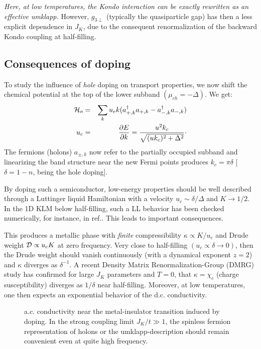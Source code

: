  \emph{Here, 
at low temperatures, the Kondo interaction
can be exactly rewritten as an effective umklapp.}
However, $g_{3\perp}$ (typically
 the quasiparticle gap) has then a less explicit
dependence in $J_K$, due to the consequent renormalization of the 
backward Kondo coupling at half-filling. 

\subsection{Consequences of doping}

To study the influence of {\it hole} doping on transport properties, 
we now shift the chemical potential
at the top of the lower subband $(\mu_{ch}=-\Delta)$. We get:
\begin{eqnarray}
\label{zero}
{\cal H}_o&=&\sum_k u_c k(a^{\dag}_{+,k}a_{+,k}-a^{\dag}_{-,k}a_{-,k})\\ 
\nonumber
u_c&=&\frac{\partial E}{\partial k}=\frac{u^2
  k_c}{\sqrt{(uk_c)^2+\Delta^2}}\cdot 
\end{eqnarray} 
The fermions (holons) $a_{\pm,k}$ now refer to the partially occupied subband
and linearizing the band structure near the new Fermi points produces
$k_c=\pi\delta$ [$\delta=1-n$, being the hole doping]. 

By
doping such a semiconductor, 
low-energy properties should be well described through a Luttinger liquid
Hamiltonian with a velocity $u_c\sim \delta/\Delta$ and $K\rightarrow 1/2$.
In the 1D KLM below half-filling, such a LL behavior
has been checked numerically, for instance, in ref.\cite{Tsvelik_LL}.
This leads to important consequences. 

This produces a metallic phase with {\it finite} compressibility
$\kappa\propto K/u_c$ and Drude weight ${\cal D}\propto
u_c K$ at zero frequency. 
Very close to half-filling $(u_c\propto
\delta\rightarrow 0)$, then the Drude weight should
vanish continuously (with
a dynamical exponent $z=2$\cite{W-Kohn,remark1})
and $\kappa$ diverges as $\delta^{-1}$. 
A recent 
Density Matrix Renormalization-Group (DMRG) study has confirmed for large
$J_K$ parameters and $T=0$,
that $\kappa=\chi_c$ (charge susceptibility)
diverges as $1/\delta$ near half-filling\cite{Shibata}.
Moreover, at low temperatures, one then expects an exponential behavior
of the d.c. conductivity.
\vskip 0.1cm
\begin{figure}
\centerline{}
\vskip 0.3cm
\caption{a.c. conductivity near the metal-insulator
transition induced by doping. In the strong coupling limit
$J_K/t\gg 1$, the spinless
fermion representation of holons or the umklapp-description 
should remain convenient even at quite high
frequency.}
\end{figure}  

